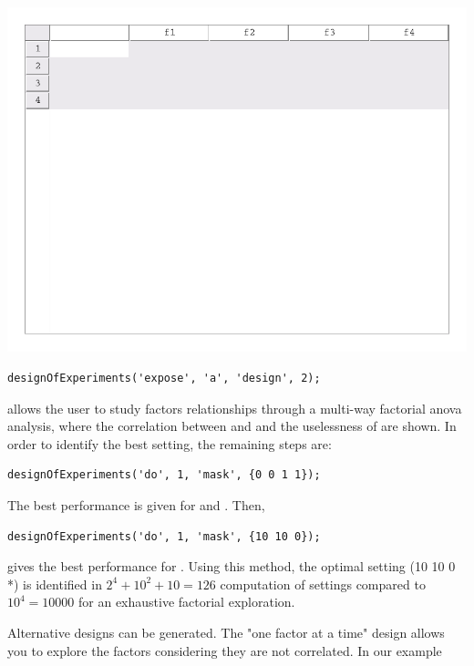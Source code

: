 \documentclass[a4paper,fleqn]{tufte-handout}
\begin{document}
\begin{marginfigure}
\includegraphics[trim={0 7.5cm 0 0},clip,width=\textwidth]{../demo/designOfExperiments/report/figures/anova}
\end{marginfigure}

\begin{lstlisting}
designOfExperiments('expose', 'a', 'design', 2);
\end{lstlisting}

allows the user to study factors relationships through a multi-way factorial anova analysis, where the correlation between  and  and the uselessness of  are shown. In order to identify the best setting, the remaining steps are:

\begin{lstlisting}
designOfExperiments('do', 1, 'mask', {0 0 1 1});
\end{lstlisting}

The best performance is given for   and  . Then,

\begin{lstlisting}
designOfExperiments('do', 1, 'mask', {10 10 0});
\end{lstlisting}

gives the best performance for . Using this method, the optimal setting (10 10 0 *) is identified in $2^4+10^2+10 = 126$ computation of settings compared to $10^4 = 10000$ for an exhaustive factorial exploration.


Alternative designs can be generated. The "one factor at a time" design allows you to explore the factors considering they are not correlated. In our example
\end{document}
